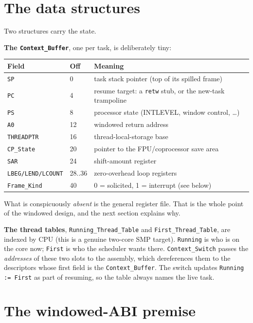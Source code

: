 \section{The data structures}

Two structures carry the state.

\textbf{The \texttt{Context\_Buffer}}, one per task, is deliberately tiny:

\begin{longtable}{p{3cm} p{1.2cm} p{8cm}}
\toprule
\textbf{Field} & \textbf{Off} & \textbf{Meaning} \\ \midrule
\endhead
\texttt{SP}         & 0  & task stack pointer (top of its spilled frame) \\
\texttt{PC}         & 4  & resume target: a \texttt{retw} stub, or the new-task trampoline \\
\texttt{PS}         & 8  & processor state (INTLEVEL, window control, \dots) \\
\texttt{A0}         & 12 & windowed return address \\
\texttt{THREADPTR}  & 16 & thread-local-storage base \\
\texttt{CP\_State}  & 20 & pointer to the FPU/coprocessor save area \\
\texttt{SAR}        & 24 & shift-amount register \\
\texttt{LBEG/LEND/LCOUNT} & 28..36 & zero-overhead loop registers \\
\texttt{Frame\_Kind} & 40 & 0 = solicited, 1 = interrupt (see below) \\
\bottomrule
\end{longtable}

What is conspicuously \emph{absent} is the general register file. That is the
whole point of the windowed design, and the next section explains why.

\textbf{The thread tables}, \texttt{Running\_Thread\_Table} and
\texttt{First\_Thread\_Table}, are indexed by CPU (this is a genuine two-core SMP
target). \texttt{Running} is who is on the core now; \texttt{First} is who the
scheduler wants there. \texttt{Context\_Switch} passes the \emph{addresses} of
these two slots to the assembly, which dereferences them to the descriptors whose
first field is the \texttt{Context\_Buffer}. The switch updates
\texttt{Running := First} as part of resuming, so the table always names the live
task.

\section{The windowed-ABI premise}

